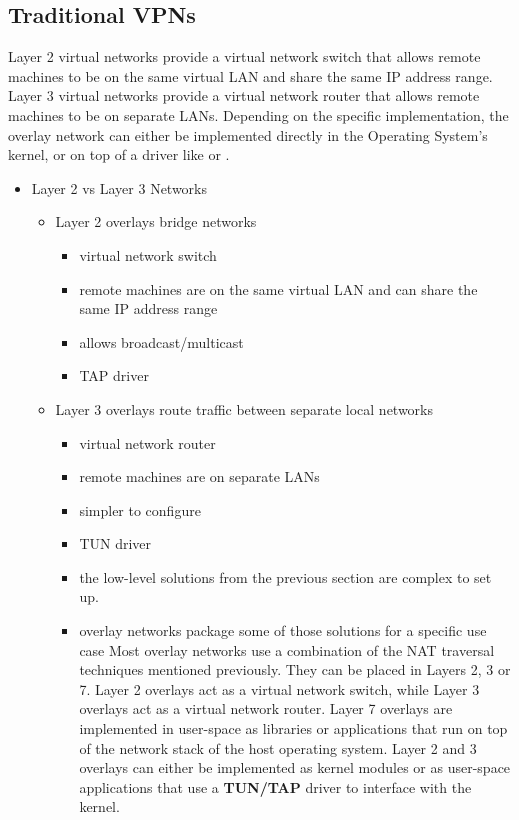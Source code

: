 \hypertarget{traditional-vpns}{%
\subsection{Traditional VPNs}\label{traditional-vpns}}

Layer 2 virtual networks provide a virtual network switch that allows
remote machines to be on the same virtual LAN and share the same IP
address range. Layer 3 virtual networks provide a virtual network router
that allows remote machines to be on separate LANs. Depending on the
specific implementation, the overlay network can either be implemented
directly in the Operating System's kernel, or on top of a driver like
 or .

\begin{itemize}
\tightlist
\item
  Layer 2 vs Layer 3 Networks

  \begin{itemize}
  \tightlist
  \item
    Layer 2 overlays bridge networks

    \begin{itemize}
    \tightlist
    \item
      virtual network switch
    \item
      remote machines are on the same virtual LAN and can share the same
      IP address range
    \item
      allows broadcast/multicast
    \item
      TAP driver
    \end{itemize}
  \item
    Layer 3 overlays route traffic between separate local networks

    \begin{itemize}
    \item
      virtual network router
    \item
      remote machines are on separate LANs
    \item
      simpler to configure
    \item
      TUN driver
    \item
      the low-level solutions from the previous section are complex to
      set up.
    \item
      overlay networks package some of those solutions for a specific
      use case Most overlay networks use a combination of the NAT
      traversal techniques mentioned previously. They can be placed in
      Layers 2, 3 or 7. Layer 2 overlays act as a virtual network
      switch, while Layer 3 overlays act as a virtual network router.
      Layer 7 overlays are implemented in user-space as libraries or
      applications that run on top of the network stack of the host
      operating system. Layer 2 and 3 overlays can either be implemented
      as kernel modules or as user-space applications that use a
      \textbf{TUN/TAP}  driver to interface with
      the kernel.
    \end{itemize}


\end{itemize}
\end{itemize}
